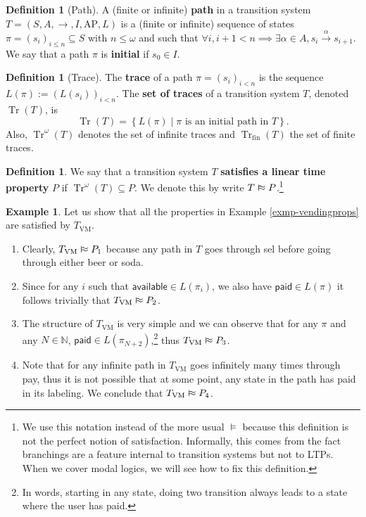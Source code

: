 \documentclass{tufte-handout} %
\theoremstyle{definition}
\newtheorem{defn}[thm]{Definition}
\newtheorem{exmp}[thm]{Example}
\theoremstyle{remark}
\newcommand{\N}{\mathbb{N}}
\newcommand{\0}{\textsf{0}}
\newcommand{\1}{\textsf{1}}
\newcommand{\AP}{\text{AP}}
\newcommand{\action}[1]{\stackrel{#1}{\rightarrow}}
\DeclareMathOperator{\Tr}{Tr}
\newcommand{\vSim}{\mathrel{\scalebox{1}[1.5]{$\shortmid$}\mkern-3.5mu\raisebox{0.1ex}{$\approx$}}}
\begin{document}
\begin{defn}[Path]
	A (finite or infinite) \textbf{path} in a transition system $T = (S, A, \rightarrow, I, \AP, L)$ is a (finite or infinite) sequence of states $\pi = (s_i)_{i \leq n} \subseteq S$ with $n \leq \omega$ and such that $\forall i, i+1 < n \implies \exists \alpha \in A, s_i \action{\alpha} s_{i+1}$. We say that a path $\pi$ is \textbf{initial} if $s_0 \in I$.
\end{defn}
\begin{defn}[Trace]
	The \textbf{trace} of a path $\pi= (s_i)_{i<n}$ is the sequence $L(\pi) := (L(s_i))_{i<n}$. The \textbf{set of traces} of a transition system $T$, denoted $\Tr(T)$, is 
	\[\Tr(T) = \left\{L(\pi) \mid \pi \text{ is an initial path in $T$}\right\}.\]
	Also, $\Tr^{\omega}(T)$ denotes the set of infinite traces and $\Tr_{\text{fin}}(T)$ the set of finite traces.
\end{defn}
\begin{defn}\label{defn-satltp}
	We say that a transition system $T$ \textbf{satisfies a linear time property} $P$ if $\Tr^{\omega}(T) \subseteq P$. We denote this by write $T\vSim P$.\footnote{We use this notation instead of the more usual $\vDash$ because this definition is not the perfect notion of satisfaction. Informally, this comes from the fact branchings are a feature internal to transition systems but not to LTPs. When we cover modal logics, we will see how to fix this definition.}
\end{defn}
\begin{exmp}
	Let us show that all the properties in Example \ref{exmp-vendingprops} are satisfied by $T_{\text{VM}}$.
	 \begin{enumerate}
	 	\item Clearly, $T_{\text{VM}}\vSim P_1$ because any path in $T$ goes through \textsf{sel} before going through either \textsf{beer} or \textsf{soda}.
	 	\item Since for any $i$ such that $\textsf{available} \in L(\pi_i)$, we also have $\textsf{paid} \in L(\pi)$ it follows trivially that $T_{\text{VM}}\vSim P_2$.
	 	\item The structure of $T_{\text{VM}}$ is very simple and we can observe that for any $\pi$ and any $N\in \N$, $\textsf{paid} \in L(\pi_{N+2})$,\footnote{In words, starting in any state, doing two transition always leads to a state where the user has paid.} thus $T_{\text{VM}} \vSim P_3$.
	 	\item Note that for any infinite path in $T_{\text{VM}}$ goes infinitely many times through \textsf{pay}, thus it is not possible that at some point, any state in the path has \textsf{paid} in its labeling. We conclude that $T_{\text{VM}} \vSim P_4$.
	 \end{enumerate}
\end{exmp}
\end{document}
